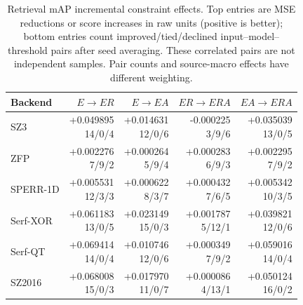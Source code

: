 \begin{table}[t]
\centering
\small
\setlength{\tabcolsep}{5pt}
\caption{Retrieval mAP incremental constraint effects. Top entries are MSE reductions or score increases in raw units (positive is better); bottom entries count improved/tied/declined input--model--threshold pairs after seed averaging. These correlated pairs are not independent samples. Pair counts and source-macro effects have different weighting.}
\label{tab:s-ablation-contrast-retrieval-AP}
\begin{tabular}{@{}lrrrr@{}}
\toprule
Backend & $E\to ER$ & $E\to EA$ & $ER\to ERA$ & $EA\to ERA$ \\
\midrule
SZ3 & \shortstack[r]{+0.049895\\14/0/4} & \shortstack[r]{+0.014631\\12/0/6} & \shortstack[r]{-0.000225\\3/9/6} & \shortstack[r]{+0.035039\\13/0/5} \\
ZFP & \shortstack[r]{+0.002276\\7/9/2} & \shortstack[r]{+0.000264\\5/9/4} & \shortstack[r]{+0.000283\\6/9/3} & \shortstack[r]{+0.002295\\7/9/2} \\
SPERR-1D & \shortstack[r]{+0.005531\\12/3/3} & \shortstack[r]{+0.000622\\8/3/7} & \shortstack[r]{+0.000432\\7/6/5} & \shortstack[r]{+0.005342\\10/3/5} \\
Serf-XOR & \shortstack[r]{+0.061183\\13/0/5} & \shortstack[r]{+0.023149\\15/0/3} & \shortstack[r]{+0.001787\\5/12/1} & \shortstack[r]{+0.039821\\12/0/6} \\
Serf-QT & \shortstack[r]{+0.069414\\14/0/4} & \shortstack[r]{+0.010746\\12/0/6} & \shortstack[r]{+0.000349\\7/9/2} & \shortstack[r]{+0.059016\\14/0/4} \\
SZ2016 & \shortstack[r]{+0.068008\\15/0/3} & \shortstack[r]{+0.017970\\11/0/7} & \shortstack[r]{+0.000086\\4/13/1} & \shortstack[r]{+0.050124\\16/0/2} \\
\bottomrule
\end{tabular}
\end{table}

